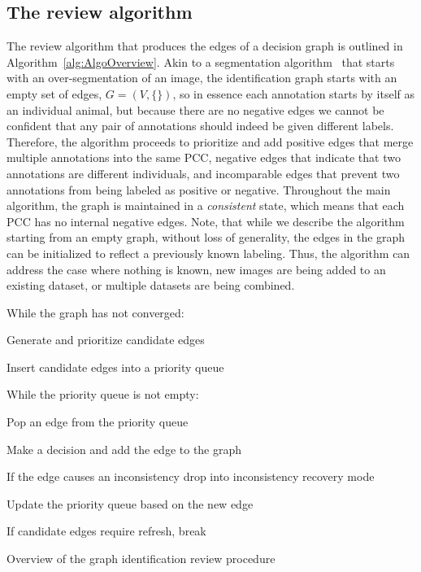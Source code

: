 

\FloatBarrier{}
\subsection{The review algorithm}\label{sub:graphalgo}


The review algorithm that produces the edges of a decision graph is outlined in Algorithm~\ref{alg:AlgoOverview}.
Akin to a segmentation algorithm~\cite{fulkerson_class_2009} that starts with an over-segmentation of an image,
  the identification graph starts with an empty set of edges, $G = (V, \{ \})$, so in essence each annotation
  starts by itself as an individual animal, but because there are no negative edges we cannot be confident that any
  pair of annotations should indeed be given different labels.
Therefore, the algorithm proceeds to prioritize and add positive edges that merge multiple annotations into the
  same PCC, negative edges that indicate that two annotations are different individuals, and incomparable edges
  that prevent two annotations from being labeled as positive or negative.
Throughout the main algorithm, the graph is maintained in a \emph{consistent} state, which means that each PCC
  has no internal negative edges.
Note, that while we describe the algorithm starting from an empty graph, without loss of generality, the edges in
  the graph can be initialized to reflect a previously known labeling.
Thus, the algorithm can address the case where nothing is known, new images are being added to an existing
  dataset, or multiple datasets are being combined.


\begin{algorithm}
        While the graph has not converged:
        \begin{enumln}
            \item Generate and prioritize candidate edges 
            \item Insert candidate edges into a priority queue 
            \item While the priority queue is not empty:
            \begin{enumln}
                \item Pop an edge from the priority queue
                \item Make a decision and add the edge to the graph
                \item If the edge causes an inconsistency drop into inconsistency recovery mode
                \item Update the priority queue based on the new edge
                \item If candidate edges require refresh, break
            \end{enumln}
        \end{enumln}
\caption[Algorithm Overview]{Overview of the graph identification review procedure}
\label{alg:AlgoOverview}
\end{algorithm}


